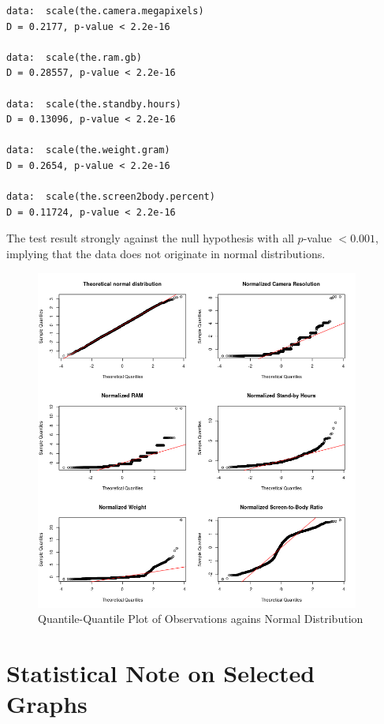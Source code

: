 \documentclass[utf8,english]{gradu3}
\begin{document}
\begin{verbatim}
data:  scale(the.camera.megapixels)
D = 0.2177, p-value < 2.2e-16

data:  scale(the.ram.gb)
D = 0.28557, p-value < 2.2e-16

data:  scale(the.standby.hours)
D = 0.13096, p-value < 2.2e-16

data:  scale(the.weight.gram)
D = 0.2654, p-value < 2.2e-16

data:  scale(the.screen2body.percent)
D = 0.11724, p-value < 2.2e-16
\end{verbatim}

The test result strongly against the null hypothesis with all $p$-value $< 0.001$, implying that the data does not originate in normal distributions.

\begin{figure}[htb]
    \centering
    \includegraphics[width=0.95\textwidth]{qqplots.png}
    \caption{Quantile-Quantile Plot of Observations agains Normal Distribution}
    \label{fig:qqplots}
\end{figure}


\section{Statistical Note on Selected Graphs}
\label{app:stats note}
\end{document}
